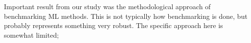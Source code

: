 \documentclass[11pt]{article}
\begin{document}
Important result from our study was the methodological approach of benchmarking ML methods. This is not typically how benchmarking is done, but probably represents something very robust. The specific approach here is somewhat limited; 




\end{document}
